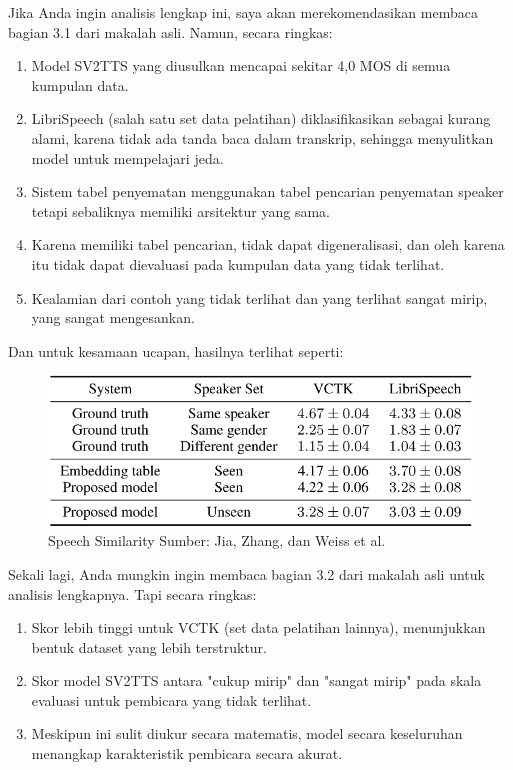 Jika Anda ingin analisis lengkap ini, saya akan merekomendasikan membaca bagian 3.1 dari makalah asli. Namun, secara ringkas:
\begin{enumerate}
\item Model SV2TTS yang diusulkan mencapai sekitar 4,0 MOS di semua kumpulan data.
\item LibriSpeech (salah satu set data pelatihan) diklasifikasikan sebagai kurang alami, karena tidak ada tanda baca dalam transkrip, sehingga menyulitkan model untuk mempelajari jeda.
\item Sistem tabel penyematan menggunakan tabel pencarian penyematan speaker tetapi sebaliknya memiliki arsitektur yang sama. \item Karena memiliki tabel pencarian, tidak dapat digeneralisasi, dan oleh karena itu tidak dapat dievaluasi pada kumpulan data yang tidak terlihat.
\item Kealamian dari contoh yang tidak terlihat dan yang terlihat sangat mirip, yang sangat mengesankan.
\end{enumerate}
Dan untuk kesamaan ucapan, hasilnya terlihat seperti:
\begin{figure}[H]
        \centerline{\includegraphics[scale=.35]{figures/hasil1}}
        \caption{Speech Similarity Sumber: Jia, Zhang, dan Weiss et al.}
		\label{similar}
\end{figure}
Sekali lagi, Anda mungkin ingin membaca bagian 3.2 dari makalah asli untuk analisis lengkapnya. Tapi secara ringkas:
\begin{enumerate}
\item Skor lebih tinggi untuk VCTK (set data pelatihan lainnya), menunjukkan bentuk dataset yang lebih terstruktur.
\item Skor model SV2TTS antara "cukup mirip" dan "sangat mirip" pada skala evaluasi untuk pembicara yang tidak terlihat.
\item Meskipun ini sulit diukur secara matematis, model secara keseluruhan menangkap karakteristik pembicara secara akurat.
\end{enumerate}